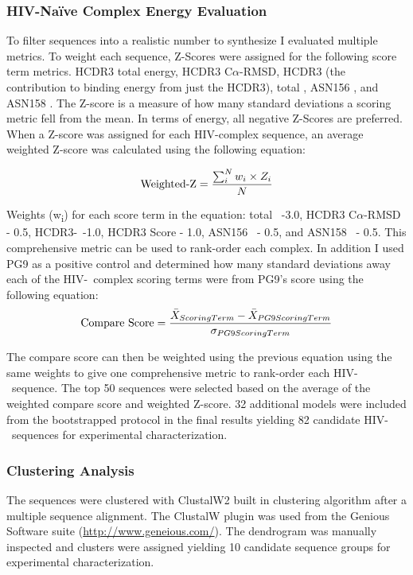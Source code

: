 \subsubsection{HIV-Na\"{i}ve Complex Energy Evaluation}
To filter \naive sequences into a realistic number to synthesize I evaluated multiple metrics. To weight each sequence, Z-Scores were assigned for the following score term metrics. HCDR3 total energy, HCDR3 C$\alpha$-RMSD, HCDR3 \ddg (the contribution to binding energy from just the HCDR3), total \ddg, ASN156 \ddg, and ASN158 \ddg. The Z-score is a measure of how many standard deviations a scoring metric fell from the mean. In terms of energy, all negative Z-Scores are preferred. When a Z-score was assigned for each HIV-\naive complex sequence, an average weighted Z-score was calculated using the following equation:

\begin{gather*}
\textup{Weighted-Z} = \frac{\sum_{i}^{N}w_{i}\times Z_{i}}{N}
\end{gather*}

Weights (w\textsubscript{i}) for each score term in the equation: total \ddg~-3.0, HCDR3 C$\alpha$-RMSD - 0.5, HCDR3-\ddg~-1.0, HCDR3 Score - 1.0, ASN156 \ddg~- 0.5, and ASN158 \ddg~- 0.5. This comprehensive metric can be used to rank-order each complex. In addition I used PG9 as a positive control and determined how many standard deviations away each of the HIV-\naive~complex scoring terms were from PG9's score using the following equation:
\begin{gather*}
\textup{Compare Score} = \frac{\bar{X}_{Scoring Term}-\bar{X}_{PG9 Scoring Term}}{\sigma_{PG9 Scoring Term}}
\end{gather*}

The compare score can then be weighted using the previous equation using the same weights to give one comprehensive metric to rank-order each HIV-\naive~sequence. The top 50 sequences were selected based on the average of the weighted compare score and weighted Z-score. 32 additional models were included from the bootstrapped protocol in the final results yielding 82 candidate HIV-\naive~sequences for experimental characterization.

\subsubsection{Clustering Analysis}
The sequences were clustered with ClustalW2 built in clustering algorithm after a multiple sequence alignment. The ClustalW plugin was used from the Genious Software suite (\url{http://www.geneious.com/}). The dendrogram was manually inspected and clusters were assigned yielding 10 candidate sequence groups for experimental characterization.

